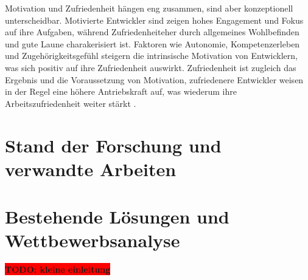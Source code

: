 \documentclass[12pt,a4paper]{report}
\newcommand{\todo}[1]{\colorbox{red}{\textbf{TODO: #1}}\\}
\begin{document}
Motivation und Zufriedenheit hängen eng zusammen, sind aber konzeptionell unterscheidbar. Motivierte Entwickler sind
zeigen hohes Engagement und Fokus auf ihre Aufgaben, während Zufriedenheiteher durch allgemeines Wohlbefinden und gute
Laune charakerisiert ist. Faktoren wie Autonomie, Kompetenzerleben und Zugehörigkeitsgefühl steigern die intrinsische 
Motivation von Entwicklern, was sich positiv auf ihre Zufriedenheit auswirkt. Zufriedenheit ist zugleich das Ergebnis und
die Voraussetzung von Motivation, zufriedenere Entwickler weisen in der Regel eine höhere Antriebskraft auf, was wiederum ihre
Arbeitszufriedenheit weiter stärkt \cite{franca_motivation_2020}.

\section{Stand der Forschung und verwandte Arbeiten}
\section{Bestehende Lösungen und Wettbewerbsanalyse}

\todo{kleine einleitung}
\end{document}
